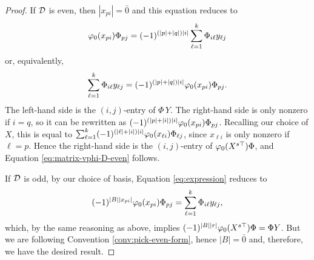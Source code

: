 \begin{proof}
    If $\mathcal{D}$ is even, then $|x_{pi}| = \bar 0$ and this equation reduces to
    \[              \varphi_0(x_{pi}) \Phi_{pj} = (-1)^{ (|p| + |q|) |i| } \sum_{\ell=1}^k \Phi_{i \ell} y_{\ell j}
    \]
    or, equivalently, 
    \[
        \sum_{\ell=1}^k \Phi_{i \ell} y_{\ell j} = (-1)^{ (|p| + |q|) |i| } \varphi_0(x_{pi}) \Phi_{pj}.
    \]
    The left-hand side is the $(i,j)$-entry of $\Phi\, Y$. 
    The right-hand side is only nonzero if $i = q$, so it can be rewritten as 
    $(-1)^{ (|p| + |i|) |i| } \varphi_0(x_{pi}) \Phi_{pj}$. 
    Recalling our choice of $X$, this is equal to $\sum_{\ell =1}^k (-1)^{ (|\ell| + |i|) |i| } \varphi_0(x_{\ell i}) \Phi_{\ell j}$, since $x_{\ell i}$ is only nonzero if $\ell = p$. 
    Hence the right-hand side is the $(i,j)$-entry of $\varphi_0 (X^{s\top}) \Phi$, and Equation \eqref{eq:matrix-vphi-D-even} follows. 
    
    If $\mathcal{D}$ is odd, by our choice of basis, Equation \eqref{eq:expression} reduces to
    \[
        (-1)^{|B| |x_{pi}|} \varphi_0(x_{pi}) \Phi_{pj} =  \sum_{\ell=1}^k \Phi_{i \ell} y_{\ell j},
    \]
    which, by the same reasoning as above, implies $(-1)^{|B||r|} \varphi_0(X^{s\top}) \Phi = \Phi Y$. 
    But we are following Convention \ref{conv:pick-even-form}, hence $|B| = \bar 0$ and, therefore, we have the desired result.
\end{proof}

    
